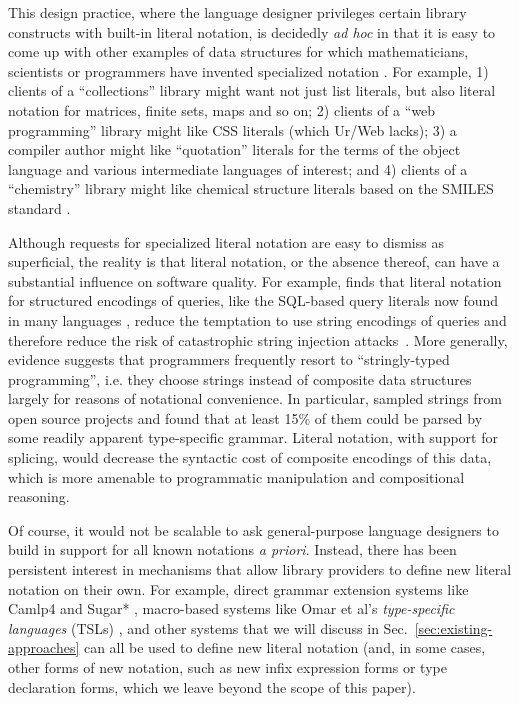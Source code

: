 \documentclass[acmsmall,review,anonymous]{acmart}\settopmatter{printfolios=true,printccs=false,printacmref=false}
\begin{document}
This design practice, where the language designer privileges certain library constructs with built-in literal notation, is decidedly \emph{ad hoc} in that it is easy to come up with other examples of data structures for which mathematicians, scientists or programmers have invented specialized notation \cite{DBLP:journals/cacm/Iverson80,cajori1928history,TSLs}. For example, 1) clients of a ``collections'' library might want not just list literals, but also literal notation for matrices, finite sets, maps and so on; 2) clients of a ``web programming'' library might like CSS literals (which Ur/Web lacks); 3) a compiler author might like ``quotation'' literals for the terms of the object language and various intermediate languages of interest; and 4) clients of a ``chemistry'' library might like chemical structure literals based on the SMILES standard \cite{anderson1987smiles}.

Although requests for specialized literal notation are easy to dismiss as superficial, the reality is that literal notation, or the absence thereof, can have a substantial influence on software quality. For example, \citet{Bravenboer:2007:PIA:1289971.1289975} finds that literal notation for structured encodings of queries, like the SQL-based query literals now found in many languages \cite{meijer2006linq}, reduce the temptation to use string encodings of queries and therefore reduce the risk of catastrophic string injection attacks~\cite{owasp2017}. More generally, evidence suggests that programmers frequently resort to ``stringly-typed programming'', i.e. they choose strings instead of composite data structures largely for reasons of notational convenience. In particular, \citet{TSLs} sampled strings from open source projects and found that at least 15\% of them could be parsed by some readily apparent type-specific grammar.
Literal notation, with support for splicing, would decrease the syntactic cost of composite encodings of this data, which is more amenable to programmatic manipulation and compositional reasoning. %



Of course, it would not be scalable to ask general-purpose language designers to build in support for all known notations \emph{a priori}. Instead, there has been persistent interest in mechanisms that allow library providers to define new literal notation on their own. For example, direct grammar extension systems like Camlp4 \cite{ocaml-manual} and Sugar* \cite{erdweg2011sugarj,erdweg2013framework}, macro-based systems like Omar et al's \emph{type-specific languages} (TSLs) \cite{TSLs}, and other systems that we will discuss in Sec.~\ref{sec:existing-approaches} can all be used to define new literal notation (and, in some cases, other forms of new notation, such as new infix expression forms or type declaration forms, which we leave beyond the scope of this paper).
\end{document}
